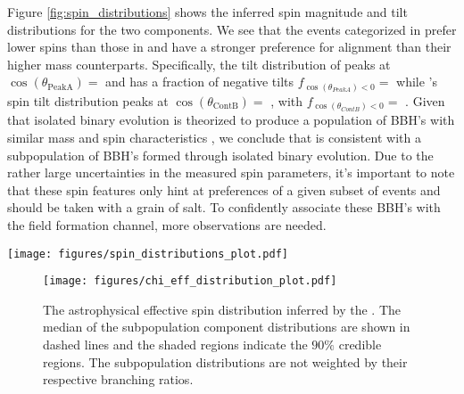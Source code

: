Figure \ref{fig:spin_distributions} shows the inferred spin magnitude and tilt distributions for the two components. We see that the events categorized in \first{} prefer lower spins than those in \contB{} and have a stronger preference for alignment than their higher mass counterparts. Specifically, the tilt distribution of \first{} peaks at $\cos(\theta_\text{PeakA})=$ \result{$\CIPlusMinus{\macros[CosTilt][Base][PeakA][max]}$} and has a fraction of negative tilts $f_{\cos(\theta_{PeakA}) < 0}=$\result{$\CIPlusMinus{\macros[CosTilt][Base][PeakA][negfrac]}$} while \contB{}'s spin tilt distribution peaks at $\cos(\theta_\text{ContB})=$ \result{$\CIPlusMinus{\macros[CosTilt][Base][ContinuumB][max]}$}, with $f_{\cos(\theta_{ContB}) < 0} = $ \result{$\CIPlusMinus{\macros[CosTilt][Base][ContinuumB][negfrac]}$}. Given that isolated binary evolution is theorized to produce a population of BBH's with similar mass and spin characteristics , we conclude that \first{} is consistent with a subpopulation of BBH's formed through isolated binary evolution. Due to the rather large uncertainties in the measured spin parameters, it's important to note that these spin features only hint at preferences of a given subset of events and should be taken with a grain of salt. To confidently associate these BBH's with the field formation channel, more observations are needed. 

\begin{figure*}[ht!]
    \begin{centering}
        \texttt{[image: figures/spin\_distributions\_plot.pdf]}
        \caption{The astrophysical spin magnitude and tilt distributions inferred by the \base{} (top left and bottom left) and the \comp{} (top right and bottom right). In each panel, the median of the subpopulation component distributions are shown in dashed lines and the shaded regions indicate the $90\%$ credible regions. The subpopulation distributions are not weighted by their respective branching ratios.}
        \label{fig:spin_distributions}
    \end{centering}
\end{figure*}

\begin{figure}[hb]
    \begin{centering}
        \texttt{[image: figures/chi\_eff\_distribution\_plot.pdf]}
        \caption{The astrophysical effective spin distribution inferred by the \comp{}. The median of the subpopulation component distributions are shown in dashed lines and the shaded regions indicate the $90\%$ credible regions. The subpopulation distributions are not weighted by their respective branching ratios.}
        \label{fig:chi_eff_distributions}
    \end{centering}
\end{figure}


